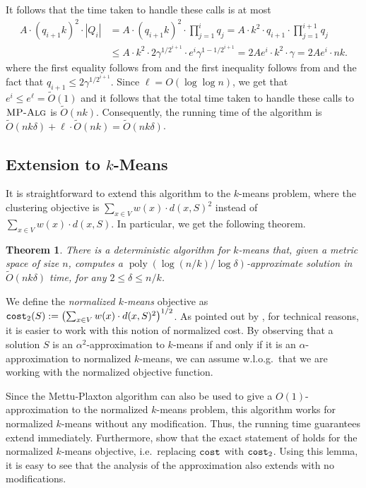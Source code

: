 \documentclass[11pt]{article}
\newcommand{\1}{\mathmybb{1}}
\newtheorem{theorem}{Theorem}[section]
\DeclareMathOperator*{\poly}{poly}
\newcommand{\cost}{\textnormal{\texttt{cost}}}
\newcommand{\MPAlg}{\textnormal{\textsc{MP-Alg}}}
\begin{document}
It follows that the time taken to handle these calls is at most
\begin{align*}
A \cdot (q_{i+1} k)^2 \cdot |Q_i| &= A \cdot (q_{i+1} k)^2 \cdot \prod_{j=1}^i q_j = A \cdot k^2 \cdot q_{i+1} \cdot \prod_{j=1}^{i+1} q_j \\ &\leq A \cdot k^2 \cdot 2\gamma^{1/2^{i+1}} \cdot e^i \gamma^{1 - 1/2^{i+1}} = 2Ae^i \cdot k^2 \cdot \gamma =  2A e^i \cdot nk.    
\end{align*}
where the first equality follows from  and the first inequality follows from  and the fact that $q_{i+1} \leq 2\gamma^{1/2^{i+1}}$. Since $\ell = O(\log \log n)$, we get that $e^i \leq e^\ell = \tilde O(1)$ and it follows that the total time taken to handle these calls to $\MPAlg$ is $\tilde O(nk)$.
Consequently, the running time of the algorithm is $\tilde O(nk\delta) + \ell \cdot \tilde O(nk) = \tilde O(nk\delta)$.




\subsection{Extension to $k$-Means}\label{sec:guha:kmeans}


It is straightforward to extend this algorithm to the $k$-means problem, where the clustering objective is $\sum_{x \in V} w(x) \cdot d(x,S)^2$ instead of $\sum_{x \in V} w(x) \cdot d(x,S)$. In particular, we get the following theorem.


\begin{theorem}
    There is a deterministic algorithm for $k$-means that, given a metric space of size $n$, computes a $\poly(\log(n/k) / \log \delta)$-approximate solution in $\tilde O(nk\delta)$ time, for any $2 \leq \delta \leq n/k$.
\end{theorem}

We define the \emph{normalized $k$-means} objective as $\cost_2(S) := \left(\sum_{x \in V}  w(x) \cdot d(x,S)^2\right)^{1/2}$. As pointed out by \cite{focs/BCLP24}, for technical reasons, it is easier to work with this notion of normalized cost. By observing that a solution $S$ is an $\alpha^2$-approximation to $k$-means if and only if it is an $\alpha$-approximation to normalized $k$-means, we can assume w.l.o.g.~that we are working with the normalized objective function.

Since the Mettu-Plaxton algorithm \cite{MettuP02} can also be used to give a $O(1)$-approximation to the normalized $k$-means problem, this algorithm works for normalized $k$-means without any modification. Thus, the running time guarantees extend immediately. Furthermore, \cite{focs/BCLP24} show that the exact statement of  holds for the normalized $k$-means objective, i.e.~replacing $\cost$ with $\cost_2$. Using this lemma, it is easy to see that the analysis of the approximation also extends with no modifications. 
\end{document}
